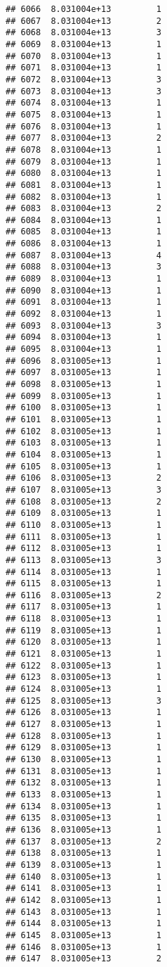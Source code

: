 \documentclass[
]{article}
\begin{document}
\begin{verbatim}
## 6066  8.031004e+13         1
## 6067  8.031004e+13         2
## 6068  8.031004e+13         3
## 6069  8.031004e+13         1
## 6070  8.031004e+13         1
## 6071  8.031004e+13         1
## 6072  8.031004e+13         3
## 6073  8.031004e+13         3
## 6074  8.031004e+13         1
## 6075  8.031004e+13         1
## 6076  8.031004e+13         1
## 6077  8.031004e+13         2
## 6078  8.031004e+13         1
## 6079  8.031004e+13         1
## 6080  8.031004e+13         1
## 6081  8.031004e+13         1
## 6082  8.031004e+13         1
## 6083  8.031004e+13         2
## 6084  8.031004e+13         1
## 6085  8.031004e+13         1
## 6086  8.031004e+13         1
## 6087  8.031004e+13         4
## 6088  8.031004e+13         3
## 6089  8.031004e+13         1
## 6090  8.031004e+13         1
## 6091  8.031004e+13         1
## 6092  8.031004e+13         1
## 6093  8.031004e+13         3
## 6094  8.031004e+13         1
## 6095  8.031004e+13         1
## 6096  8.031005e+13         1
## 6097  8.031005e+13         1
## 6098  8.031005e+13         1
## 6099  8.031005e+13         1
## 6100  8.031005e+13         1
## 6101  8.031005e+13         1
## 6102  8.031005e+13         1
## 6103  8.031005e+13         1
## 6104  8.031005e+13         1
## 6105  8.031005e+13         1
## 6106  8.031005e+13         2
## 6107  8.031005e+13         3
## 6108  8.031005e+13         2
## 6109  8.031005e+13         1
## 6110  8.031005e+13         1
## 6111  8.031005e+13         1
## 6112  8.031005e+13         1
## 6113  8.031005e+13         3
## 6114  8.031005e+13         1
## 6115  8.031005e+13         1
## 6116  8.031005e+13         2
## 6117  8.031005e+13         1
## 6118  8.031005e+13         1
## 6119  8.031005e+13         1
## 6120  8.031005e+13         1
## 6121  8.031005e+13         1
## 6122  8.031005e+13         1
## 6123  8.031005e+13         1
## 6124  8.031005e+13         1
## 6125  8.031005e+13         3
## 6126  8.031005e+13         1
## 6127  8.031005e+13         1
## 6128  8.031005e+13         1
## 6129  8.031005e+13         1
## 6130  8.031005e+13         1
## 6131  8.031005e+13         1
## 6132  8.031005e+13         1
## 6133  8.031005e+13         1
## 6134  8.031005e+13         1
## 6135  8.031005e+13         1
## 6136  8.031005e+13         1
## 6137  8.031005e+13         2
## 6138  8.031005e+13         1
## 6139  8.031005e+13         1
## 6140  8.031005e+13         1
## 6141  8.031005e+13         1
## 6142  8.031005e+13         1
## 6143  8.031005e+13         1
## 6144  8.031005e+13         1
## 6145  8.031005e+13         1
## 6146  8.031005e+13         1
## 6147  8.031005e+13         2

\end{verbatim}
\end{document}
